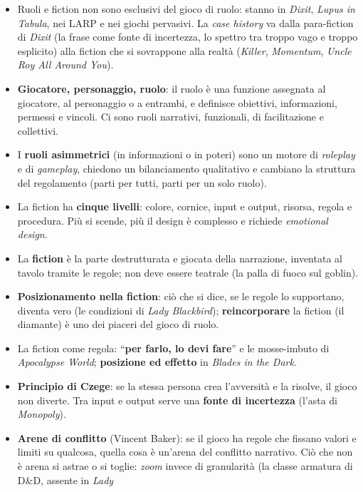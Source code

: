 \begin{itemize}
  \item Ruoli e fiction non sono esclusivi del gioco di ruolo: stanno in \emph{Dixit}, \emph{Lupus in
        Tabula}, nei LARP e nei giochi pervasivi. La \emph{case history} va dalla para-fiction di
        \emph{Dixit} (la frase come fonte di incertezza, lo spettro tra troppo vago e troppo
        esplicito) alla fiction che si sovrappone alla realtà (\emph{Killer}, \emph{Momentum},
        \emph{Uncle Roy All Around You}).
  \item \textbf{Giocatore, personaggio, ruolo}: il ruolo è una funzione assegnata al giocatore, al
        personaggio o a entrambi, e definisce obiettivi, informazioni, permessi e vincoli. Ci sono
        ruoli narrativi, funzionali, di facilitazione e collettivi.
  \item I \textbf{ruoli asimmetrici} (in informazioni o in poteri) sono un motore di \emph{roleplay} e
        di \emph{gameplay}, chiedono un bilanciamento qualitativo e cambiano la struttura del
        regolamento (parti per tutti, parti per un solo ruolo).
  \item La fiction ha \textbf{cinque livelli}: colore, cornice, input e output, risorsa, regola e
        procedura. Più si scende, più il design è complesso e richiede \emph{emotional design}.
  \item La \textbf{fiction} è la parte destrutturata e giocata della narrazione, inventata al tavolo
        tramite le regole; non deve essere teatrale (la palla di fuoco sul goblin).
  \item \textbf{Posizionamento nella fiction}: ciò che si dice, se le regole lo supportano, diventa vero
        (le condizioni di \emph{Lady Blackbird}); \textbf{reincorporare} la fiction (il diamante) è uno
        dei piaceri del gioco di ruolo.
  \item La fiction come regola: ``\textbf{per farlo, lo devi fare}'' e le mosse-imbuto di
        \emph{Apocalypse World}; \textbf{posizione ed effetto} in \emph{Blades in the Dark}.
  \item \textbf{Principio di Czege}: se la stessa persona crea l'avversità e la risolve, il gioco non
        diverte. Tra input e output serve una \textbf{fonte di incertezza} (l'asta di \emph{Monopoly}).
  \item \textbf{Arene di conflitto} (Vincent Baker): se il gioco ha regole che fissano valori e limiti
        su qualcosa, quella cosa è un'arena del conflitto narrativo. Ciò che non è arena si astrae o si
        toglie: \emph{zoom} invece di granularità (la classe armatura di D\&D, assente in \emph{Lady
}
\end{itemize}
